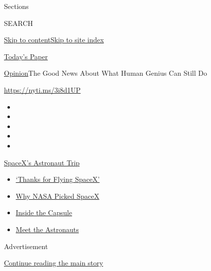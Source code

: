 Sections

SEARCH

\protect\hyperlink{site-content}{Skip to
content}\protect\hyperlink{site-index}{Skip to site index}

\href{https://myaccount.nytimes.com/auth/login?response_type=cookie\&client_id=vi}{}

\href{https://www.nytimes.com/section/todayspaper}{Today's Paper}

\href{/section/opinion}{Opinion}\textbar{}The Good News About What Human
Genius Can Still Do

\href{https://nyti.ms/3i8d1UP}{https://nyti.ms/3i8d1UP}

\begin{itemize}
\item
\item
\item
\item
\item
\end{itemize}

\href{https://www.nytimes.com/2020/08/02/science/spacex-astronauts-splashdown.html?action=click\&pgtype=Article\&state=default\&region=TOP_BANNER\&context=storylines_menu}{SpaceX's
Astronaut Trip}

\begin{itemize}
\tightlist
\item
  \href{https://www.nytimes.com/2020/08/02/science/spacex-astronauts-splashdown.html?action=click\&pgtype=Article\&state=default\&region=TOP_BANNER\&context=storylines_menu}{`Thanks
  for Flying SpaceX'}
\item
  \href{https://www.nytimes.com/2020/05/26/science/spacex-launch-nasa.html?action=click\&pgtype=Article\&state=default\&region=TOP_BANNER\&context=storylines_menu}{Why
  NASA Picked SpaceX}
\item
  \href{https://www.nytimes.com/interactive/2020/05/26/science/spacex-nasa.html?action=click\&pgtype=Article\&state=default\&region=TOP_BANNER\&context=storylines_menu}{Inside
  the Capsule}
\item
  \href{https://www.nytimes.com/2020/05/27/science/bob-behnken-doug-hurley.html?action=click\&pgtype=Article\&state=default\&region=TOP_BANNER\&context=storylines_menu}{Meet
  the Astronauts}
\end{itemize}

Advertisement

\protect\hyperlink{after-top}{Continue reading the main story}

